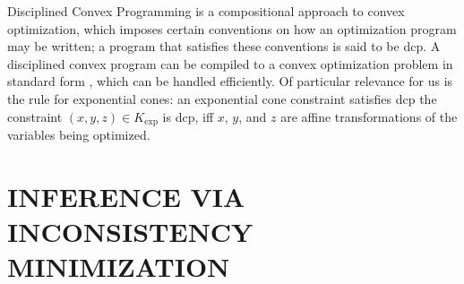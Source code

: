 \documentclass[twoside]{article}
\begin{document}
Disciplined Convex Programming \parencite{dcp-thesis} is a
    compositional approach to convex optimization, which imposes
    certain conventions on how an optimization program may be written;
        a program that satisfies these conventions is said to be dcp.  
A disciplined convex program can be compiled to a convex optimization
problem in standard form \parencite{agrawal2018rewriting}, which can
be handled efficiently. 
Of particular relevance for us is the rule for 
exponential cones: an exponential cone constraint satisfies dcp 
the constraint $(x,y,z) \in K_{\exp}$ is dcp, iff $x$, $y$, and $z$
are affine transformations of the variables being optimized.  



\section{INFERENCE VIA INCONSISTENCY MINIMIZATION}
    \label{sec:inf-via-inc}
\end{document}
